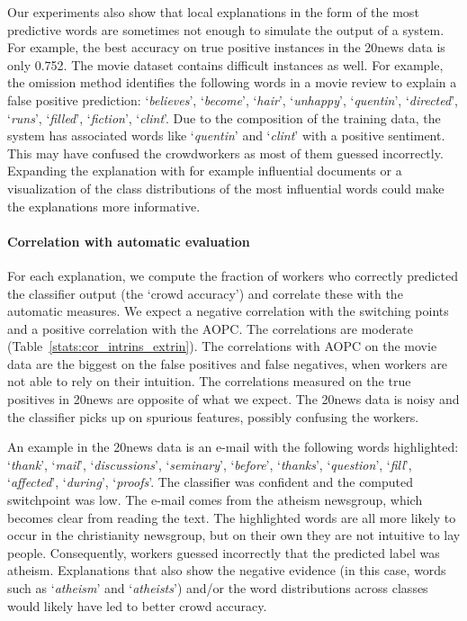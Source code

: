 \documentclass[11pt,a4paper]{article}
\begin{document}
Our experiments also show that local explanations in the form of the most predictive 
words are sometimes not enough to simulate the output of a system. For example, the best accuracy on true positive instances in the 20news data is only 0.752.
The movie dataset contains  difficult instances as well. 
For example, the omission method identifies the following words in a movie review to explain a false positive prediction: `\textit{believes}', `\textit{become}', `\textit{hair}', `\textit{unhappy}', `\textit{quentin}', `\textit{directed}', `\textit{runs}', `\textit{filled}', `\textit{fiction}', `\textit{clint}'. Due to the composition of the training data, the system has associated words like `\textit{quentin}' and `\textit{clint}' with a positive sentiment. 
This may have confused the crowdworkers as most of them guessed incorrectly. Expanding the explanation with for example influential documents \cite{koh2017understanding} or a visualization of the class distributions of the most influential words could make the explanations more informative.



\paragraph*{Correlation with automatic evaluation} 
For each explanation, we compute the fraction of workers who correctly predicted the classifier output (the `crowd accuracy') and correlate these with the automatic measures.  We expect a negative correlation with the switching points and a positive correlation with the AOPC.
The correlations are moderate (Table~\ref{stats:cor_intrins_extrin}). The correlations with AOPC on the movie data are the biggest  on the false positives and false negatives,  when workers are  not able to rely on their intuition. The correlations measured on the true positives in  20news  are opposite of what we expect. The 20news data is  noisy and the classifier picks up on spurious features, possibly confusing the workers.

An example in  the 20news data  is an e-mail
with the following words highlighted:
`\textit{thank}', `\textit{mail}', `\textit{discussions}', `\textit{seminary}', `\textit{before}', `\textit{thanks}', `\textit{question}', `\textit{fill}', `\textit{affected}', `\textit{during}', `\textit{proofs}'. The classifier was confident and the computed switchpoint was low.
The e-mail comes from the atheism newsgroup, which becomes clear from reading the text.
The highlighted words are all more likely to occur in the christianity  newsgroup, but on their own they are not intuitive to lay people. 
Consequently, workers guessed incorrectly that the predicted label was atheism.
Explanations that also show the negative evidence  (in this case,  words such as `\textit{atheism}' and `\textit{atheists}') and/or the word distributions across classes would likely have led to better crowd accuracy.
\end{document}
